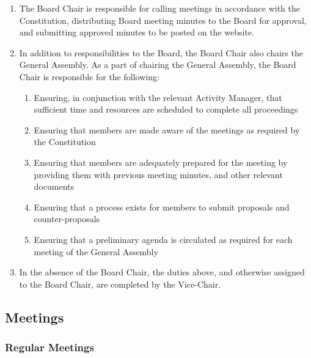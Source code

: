 \begin{enumerate}
 \item
  The Board Chair is responsible for calling meetings in accordance with the Constitution, distributing Board meeting minutes to the Board for approval, and submitting approved minutes to be posted on the website.
 \item
  In addition to responsibilities to the Board, the Board Chair also chairs the General Assembly. As a part of chairing the General Assembly, the Board Chair is responsible for the following:
  \begin{enumerate}
   \item
    Ensuring, in conjunction with the relevant Activity Manager, that sufficient time and resources are scheduled to complete all proceedings
   \item
    Ensuring that members are made aware of the meetings as required by the Constitution
   \item
    Ensuring that members are adequately prepared for the meeting by providing them with previous meeting minutes, and other relevant documents
   \item
    Ensuring that a process exists for members to submit proposals and counter-proposals
   \item
    Ensuring that a preliminary agenda is circulated as required for each meeting of the General Assembly

  \end{enumerate}
 \item
  In the absence of the Board Chair, the duties above, and otherwise assigned to the Board Chair, are completed by the Vice-Chair.

\end{enumerate}

\subsection{Meetings}
\label{meetings}

\subsubsection{Regular Meetings}
\label{regular-meetings}

